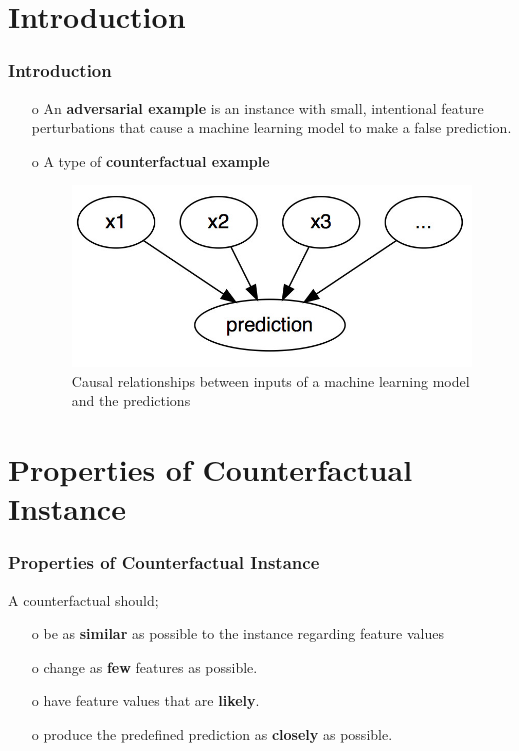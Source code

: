\documentclass[12pt]{beamer}
\begin{document}
\section{Introduction}
\begin{frame}
\frametitle{Introduction}
	\begin{itemize}
		\item[o] An \textbf{adversarial example} is an instance with small, intentional feature perturbations that cause a machine learning model to make a false prediction.\protect\footnotemark
		
		\item[o] A type of \textbf{counterfactual example}
		
		\begin{figure}
			\centering
			\includegraphics[width=0.7\linewidth,height=0.3\textheight]{img/graph}
			\caption{Causal relationships between inputs of a machine learning model and the predictions}
			\label{fig:graph}
		\end{figure}
		
	\end{itemize}
\end{frame}

\section{Properties of Counterfactual Instance}
\begin{frame}
\frametitle{Properties of Counterfactual Instance}
A counterfactual should;
\begin{itemize}
	\item[o] be as \textbf{similar} as possible to the instance regarding feature values \pause
	\item[o] change as \textbf{few} features as possible. \pause
	\item[o] have feature values that are \textbf{likely}. \pause
	\item[o] produce the predefined prediction as \textbf{closely} as possible.
\end{itemize}
\end{frame}
\end{document}
